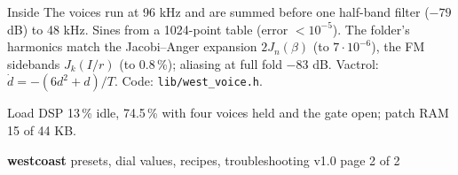 \documentclass{article}
\begin{document}
\begin{minipage}[t]{68mm}\vspace{0pt}
\begin{card}{Inside}
\fontsize{6.6}{7.8}\selectfont
The voices run at 96 kHz and are summed before one half-band filter (\(-79\) dB) to 48 kHz.
Sines from a 1024-point table (error \(< 10^{-5}\)). The folder's harmonics match the
Jacobi--Anger expansion \(2 J_n(\beta)\) (to \(7\cdot10^{-6}\)), the FM sidebands \(J_k(I/r)\)
(to 0.8\,\%); aliasing at full fold \(-83\) dB. Vactrol: \(\dot d = -(6d^2 + d)/T\).
Code: \texttt{lib/west\_voice.h}.
\end{card}
\begin{card}{Load}
DSP 13\,\% idle, 74.5\,\% with four voices held and the gate open; patch RAM 15 of 44 KB.
\end{card}
\end{minipage}

\newpage
{\fontsize{16}{18}\selectfont\bfseries westcoast}\hspace{3mm}%
{\fontsize{9.5}{11}\selectfont presets, dial values, recipes, troubleshooting}\hfill
{\fontsize{7}{8}\selectfont\color{black!55} v1.0 \textperiodcentered{} page 2 of 2}
\end{document}

